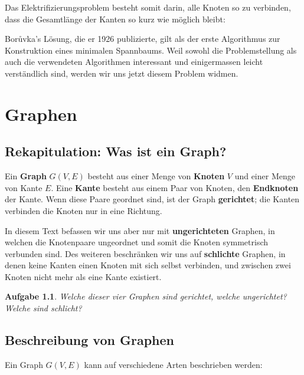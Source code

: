 \documentclass[12pt,a4paper]{report}
\theoremstyle{break}
\newtheorem{exercise}{Aufgabe}[section]
\begin{document}
Das Elektrifizierungsproblem besteht somit darin, alle Knoten so zu
verbinden, dass die Gesamtl\"{a}nge der Kanten so kurz wie m\"{o}glich bleibt:  

Bor\r{u}vka's L\"{o}sung, die er 1926 publizierte, gilt als der erste
Algorithmus zur Konstruktion eines minimalen Spannbaums. Weil sowohl
die Problemstellung als auch die verwendeten Algorithmen interessant
und einigermassen leicht verst\"{a}ndlich sind, werden wir uns jetzt diesem Problem widmen.

\chapter{Graphen}
\label{graphs}

\section{Rekapitulation: Was ist ein Graph?}

Ein \textbf{Graph} $G(V,E)$ besteht aus einer Menge von
\textbf{Knoten} $V$ und einer Menge von Kante $E$. Eine \textbf{Kante}
besteht aus einem Paar von Knoten, den \textbf{Endknoten} der
Kante. Wenn diese Paare geordnet sind, ist der Graph
\textbf{gerichtet}; die Kanten verbinden die Knoten nur in eine
Richtung. 

In diesem Text befassen wir uns aber nur mit
\textbf{ungerichteten} Graphen, in welchen die Knotenpaare ungeordnet
und somit die Knoten symmetrisch verbunden sind.  Des weiteren
beschr\"{a}nken wir uns auf \textbf{schlichte} Graphen, in denen keine
Kanten einen Knoten mit sich selbst verbinden, und zwischen zwei
Knoten nicht mehr als eine Kante existiert.

\begin{exercise}
Welche dieser vier Graphen sind gerichtet, welche ungerichtet? Welche
sind schlicht?

\end{exercise}

\section{Beschreibung von Graphen}
\label{Beschreibung}
\noindent Ein Graph $G(V,E)$ kann auf verschiedene Arten beschrieben werden:
\end{document}
